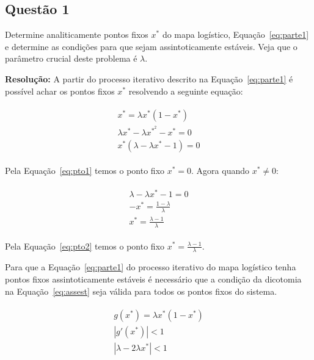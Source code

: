 \documentclass[12pt]{article}
\begin{document}
\subsection*{Questão 1}
\label{sec:p1q1}
Determine analiticamente pontos fixos $x^{*}$ do mapa logístico, Equação~\ref{eq:parte1} e determine as condições para que sejam assintoticamente estáveis. Veja que o parâmetro crucial deste problema é $\lambda$.

\textbf{Resolução:}
A partir do processo iterativo descrito na Equação~\ref{eq:parte1} é possível achar os pontos fixos $x^{*}$ resolvendo a seguinte equação:

\begin{eqnarray}
    \begin{split}
        x^{*} = \lambda x^{*} (1 - x^{*}) \\
        \lambda x^{*} -  \lambda x^{*^{2}} - x^{*} = 0 \\
        x^{*} (\lambda - \lambda x^{*} - 1) = 0
    \end{split}
\label{eq:pto1}
\end{eqnarray}

Pela Equação~\ref{eq:pto1} temos o ponto fixo $x^{*} = 0$. Agora quando $x^{*} \neq 0$:

\begin{eqnarray}
    \begin{split}
        \lambda - \lambda x^{*} - 1 = 0 \\
        - x^{*} = \frac{1 - \lambda}{\lambda} \\
        x^{*} = \frac{\lambda - 1}{\lambda}
    \end{split}
\label{eq:pto2}
\end{eqnarray}

Pela Equação~\ref{eq:pto2} temos o ponto fixo $x^{*} = \frac{\lambda - 1}{\lambda}$.

Para que a Equação~\ref{eq:parte1} do processo iterativo do mapa logístico tenha pontos fixos assintoticamente estáveis é necessário que a condição da dicotomia na Equação~\ref{eq:assest} seja válida para todos os pontos fixos do sistema.

\begin{eqnarray}
    \begin{split}
        g(x^{*}) = \lambda x^{*} (1 - x^{*}) \\
        \left| g'(x^{*}) \right| < 1 \\
        \left| \lambda - 2\lambda x^{*} \right| < 1
    \end{split}
\label{eq:assest}
\end{eqnarray}
\end{document}
